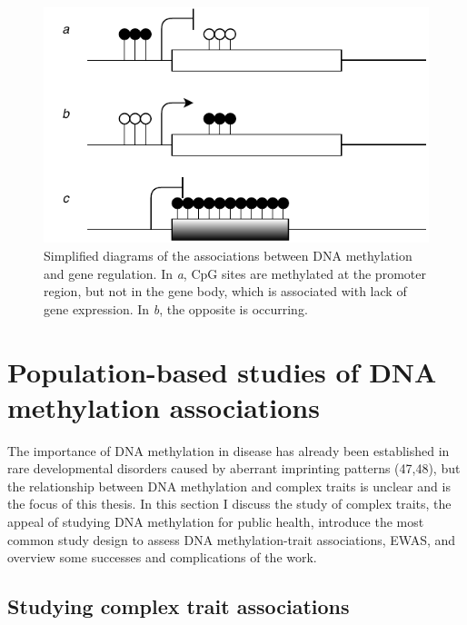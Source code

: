 \documentclass[11pt,oneside]{bristolthesis}
\begin{document}
\begin{figure}

{\centering \includegraphics[width=1\linewidth]{figure/01-introduction/dnam-gene-expression} 

}

\caption{Simplified diagrams of the associations between DNA methylation and gene regulation. In \emph{a}, CpG sites are methylated at the promoter region, but not in the gene body, which is associated with lack of gene expression. In \emph{b}, the opposite is occurring.}\label{fig:dnam-functions}
\end{figure}
\hypertarget{dnam-phs}{%
\section{Population-based studies of DNA methylation associations}\label{dnam-phs}}

The importance of DNA methylation in disease has already been established in rare developmental disorders caused by aberrant imprinting patterns (47,48), but the relationship between DNA methylation and complex traits is unclear and is the focus of this thesis. In this section I discuss the study of complex traits, the appeal of studying DNA methylation for public health, introduce the most common study design to assess DNA methylation-trait associations, EWAS, and overview some successes and complications of the work.

\hypertarget{studying-complex-trait-associations}{%
\subsection{Studying complex trait associations}\label{studying-complex-trait-associations}}
\end{document}
